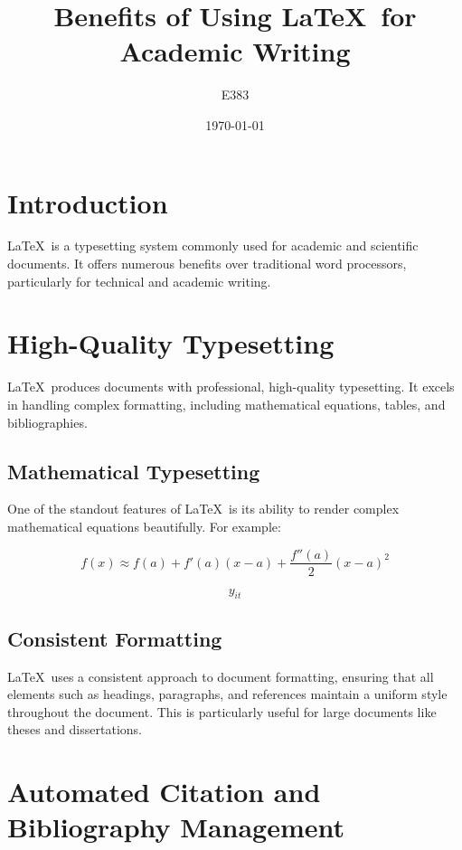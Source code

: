 \documentclass{article}
\title{Benefits of Using \LaTeX\ for Academic Writing}
\author{E383}
\date{\today}
\begin{document}
\maketitle

\tableofcontents

\section{Introduction}

\LaTeX\ is a typesetting system commonly used for academic and scientific documents. It offers numerous benefits over traditional word processors, particularly for technical and academic writing.

\section{High-Quality Typesetting}

\LaTeX\ produces documents with professional, high-quality typesetting. It excels in handling complex formatting, including mathematical equations, tables, and bibliographies. 

\subsection{Mathematical Typesetting}

One of the standout features of \LaTeX\ is its ability to render complex mathematical equations beautifully. For example:

\begin{equation}
\label{eq:taylor}
f(x) \approx f(a) + f'(a)(x - a) + \frac{f''(a)}{2}(x - a)^2
\end{equation}

\begin{equation}
    y_{it}
\end{equation}

\subsection{Consistent Formatting}

\LaTeX\ uses a consistent approach to document formatting, ensuring that all elements such as headings, paragraphs, and references maintain a uniform style throughout the document. This is particularly useful for large documents like theses and dissertations.

\section{Automated Citation and Bibliography Management}
\end{document}
